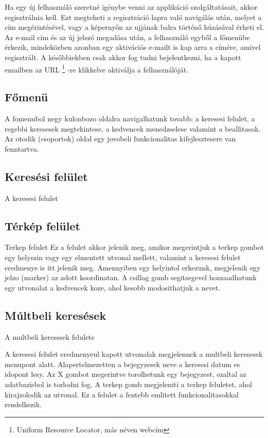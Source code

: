 Ha egy új felhasználó szeretné igénybe venni az applikáció szolgáltatásait, akkor regisztrálnia kell. Ezt megteheti a regisztráció lapra való navigálás után, melyet a cím megérintésével, vagy a képernyőn az ujjának balra történő húzásával érheti el. Az e-mail cím és az új jelszó megadása után, a felhasználó egyből a főmenübe érkezik, mindeközben azonban egy aktivációs e-mailt is kap arra a címére, amivel regisztrált. A későbbiekben csak akkor fog tudni bejelentkezni, ha a kapott emailben az URL%
\footnote{ %
	Uniform Resource Locator, más néven webcím
}  %
-re klikkelve aktiválja a felhasználóját.

\subsection{Főmenü}

A fomenubol negy kulonbozo oldalra navigalhatunk tovabb: a keresesi felulet, a regebbi keresesek megtekintese, a kedvencek menedzselese valamint a beallitasok.
Az otodik (csoportok) oldal egy jovobeli funkcionalitas kifejlesztesere van fenntartva.

\subsection{Keresési felület}
A keresesi felulet

\subsection{Térkép felület}

Terkep felulet
Ez a felulet akkor jelenik meg, amikor megerintjuk a terkep gombot egy helyszin vagy egy elmentett utvonal mellett, valamint a keresesi felulet eredmenye is itt jelenik meg.
Amennyiben egy helyintol erkezunk, megjelenik egy jelzo (marker) az adott koordinatan.
A csillag gomb segitsegevel hozzaadhatunk egy utvonalat a kedvencek koze, ahol kesobb modosithatjuk a nevet.

\subsection{Múltbeli keresések}
A multbeli keresesek felulete

A keresesi felulet eredmenyeul kapott utvonalak megjelennek a multbeli keresesek menupont alatt.
Alapertelmezetten a bejegyzesek neve a keresesi datum es idopont lesy. 
Az X gombot megerintve torolhetunk egy bejegyzest, ezaltal az adatbazisbol is torlodni fog.
A terkep gomb megjeleniti a terkep feluletet, ahol kirajzolodik az utvonal. Ez a felulet a fentebb emlitett funkcionalitasokkal rendelkezik.


